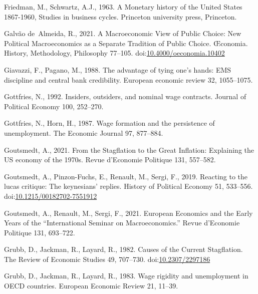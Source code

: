 \documentclass[
  12pt,
  onecolumn]{article}
\newlength{\cslhangindent}
\newlength{\cslentryspacingunit} %
\newenvironment{CSLReferences}[2] %
 {%
  \setlength{\parindent}{0pt}
  \ifodd #1
  \let\oldpar\par
  \def\par{\hangindent=\cslhangindent\oldpar}
  \fi
  \setlength{\parskip}{#2\cslentryspacingunit}
 }%
 {}
\begin{document}
\begin{CSLReferences}{1}{0}
\leavevmode{}%
Friedman, M., Schwartz, A.J., 1963. A {Monetary} history of the {United}
{States} 1867-1960, Studies in business cycles. Princeton university
press, Princeton.

\leavevmode{}%
Galvão de~Almeida, R., 2021. A {Macroeconomic View} of {Public Choice}:
{New Political Macroeconomics} as a {Separate Tradition} of {Public
Choice}. Œconomia. History, Methodology, Philosophy 77--105.
doi:\href{https://doi.org/10.4000/oeconomia.10402}{10.4000/oeconomia.10402}

\leavevmode{}%
Giavazzi, F., Pagano, M., 1988. The advantage of tying one's hands:
{EMS} discipline and central bank credibility. European economic review
32, 1055--1075.

\leavevmode{}%
Gottfries, N., 1992. Insiders, outsiders, and nominal wage contracts.
Journal of Political Economy 100, 252--270.

\leavevmode{}%
Gottfries, N., Horn, H., 1987. Wage formation and the persistence of
unemployment. The Economic Journal 97, 877--884.

\leavevmode{}%
Goutsmedt, A., 2021. From the {Stagflation} to the {Great Inflation}:
{Explaining} the {US} economy of the 1970s. Revue d'Economie Politique
131, 557--582.

\leavevmode{}%
Goutsmedt, A., Pinzon-Fuchs, E., Renault, M., Sergi, F., 2019. Reacting
to the lucas critique: {The} keynesians' replies. History of Political
Economy 51, 533--556.
doi:\href{https://doi.org/10.1215/00182702-7551912}{10.1215/00182702-7551912}

\leavevmode{}%
Goutsmedt, A., Renault, M., Sergi, F., 2021. European {Economics} and
the {Early Years} of the {``{International Seminar} on
{Macroeconomics}.''} Revue d'Economie Politique 131, 693--722.

\leavevmode{}%
Grubb, D., Jackman, R., Layard, R., 1982. Causes of the {Current
Stagflation}. The Review of Economic Studies 49, 707--730.
doi:\href{https://doi.org/10.2307/2297186}{10.2307/2297186}

\leavevmode{}%
Grubb, D., Jackman, R., Layard, R., 1983. Wage rigidity and unemployment
in {OECD} countries. European Economic Review 21, 11--39.


\end{CSLReferences}
\end{document}
